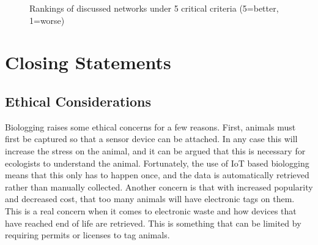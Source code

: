 \documentclass[sigplan,screen,nonacm]{acmart}
\begin{document}
\begin{figure}[htbp]
  \centering
  \caption{Rankings of discussed networks under 5 critical criteria (5=better, 1=worse)}
  \label{fig:network_barplot}
\end{figure}

\section{Closing Statements}
\label{sec:Closing Statements}

\subsection{Ethical Considerations}
\label{sec:Ethical Considerations}

Biologging raises some ethical concerns for a few reasons. First, animals must first be captured so that a sensor device can be 
attached. In any case this will increase the stress on the animal, and it can be argued that this is necessary for ecologists to understand the animal. 
Fortunately, the use of IoT based biologging means that this only has to happen once, and the data is automatically retrieved rather than manually 
collected. Another concern is that with increased popularity and decreased cost, that too many animals will have electronic tags on them. This is a 
real concern when it comes to electronic waste and how devices that have reached end of life are retrieved. This is something that can be limited 
by requiring permits or licenses to tag animals.
\end{document}
